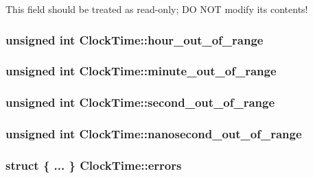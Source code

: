 This field should be treated as read-\/only; D\-O N\-O\-T modify its contents! \hypertarget{structClockTime_ae1b535b4a771fa99feb0ca7e4d39d452}{
\subsubsection[{hour\-\_\-out\-\_\-of\-\_\-range}]{\setlength{\rightskip}{0pt plus 5cm}unsigned int Clock\-Time\-::hour\-\_\-out\-\_\-of\-\_\-range}}\label{structClockTime_ae1b535b4a771fa99feb0ca7e4d39d452}
\hypertarget{structClockTime_a3cbd954dccf7539e4a03293e19bcfe2c}{
\subsubsection[{minute\-\_\-out\-\_\-of\-\_\-range}]{\setlength{\rightskip}{0pt plus 5cm}unsigned int Clock\-Time\-::minute\-\_\-out\-\_\-of\-\_\-range}}\label{structClockTime_a3cbd954dccf7539e4a03293e19bcfe2c}
\hypertarget{structClockTime_a3dd3292426da0f8b633cffcb24a26069}{
\subsubsection[{second\-\_\-out\-\_\-of\-\_\-range}]{\setlength{\rightskip}{0pt plus 5cm}unsigned int Clock\-Time\-::second\-\_\-out\-\_\-of\-\_\-range}}\label{structClockTime_a3dd3292426da0f8b633cffcb24a26069}
\hypertarget{structClockTime_ac7051869fd450e25f77b7fd3c807bb8f}{
\subsubsection[{nanosecond\-\_\-out\-\_\-of\-\_\-range}]{\setlength{\rightskip}{0pt plus 5cm}unsigned int Clock\-Time\-::nanosecond\-\_\-out\-\_\-of\-\_\-range}}\label{structClockTime_ac7051869fd450e25f77b7fd3c807bb8f}
\hypertarget{structClockTime_a7aa79d494a580c4961d5e0f0c2e112a0}{
\subsubsection[{errors}]{\setlength{\rightskip}{0pt plus 5cm}struct \{ ... \}   Clock\-Time\-::errors}}\label{structClockTime_a7aa79d494a580c4961d5e0f0c2e112a0}


